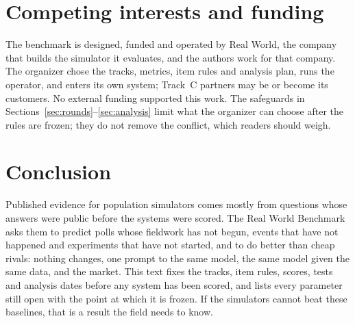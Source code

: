 \documentclass[11pt]{article}
\begin{document}
\section{Competing interests and funding}

The benchmark is designed, funded and operated by Real World, the company that builds the simulator it evaluates, and the authors work for that company. The organizer chose the tracks, metrics, item rules and analysis plan, runs the operator, and enters its own system; Track~C partners may be or become its customers. No external funding supported this work. The safeguards in Sections~\ref{sec:rounds}--\ref{sec:analysis} limit what the organizer can choose after the rules are frozen; they do not remove the conflict, which readers should weigh.

\section{Conclusion}

Published evidence for population simulators comes mostly from questions whose answers were public before the systems were scored. The Real World Benchmark asks them to predict polls whose fieldwork has not begun, events that have not happened and experiments that have not started, and to do better than cheap rivals: nothing changes, one prompt to the same model, the same model given the same data, and the market. This text fixes the tracks, item rules, scores, tests and analysis dates before any system has been scored, and lists every parameter still open with the point at which it is frozen. If the simulators cannot beat these baselines, that is a result the field needs to know.



\end{document}
